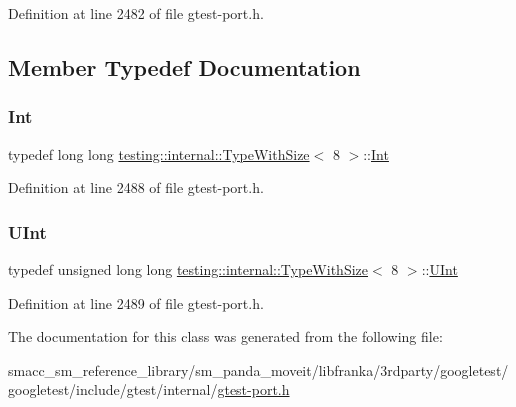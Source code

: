 Definition at line 2482 of file gtest-\/port.\+h.



\subsection{Member Typedef Documentation}
\mbox{\label{classtesting_1_1internal_1_1TypeWithSize_3_018_01_4_a36d5697e5f5254b0495f13c97d747e36}} 
\subsubsection{\texorpdfstring{Int}{Int}}
{\footnotesize\ttfamily typedef long long \hyperlink{classtesting_1_1internal_1_1TypeWithSize}{testing\+::internal\+::\+Type\+With\+Size}$<$ 8 $>$\+::\hyperlink{classtesting_1_1internal_1_1TypeWithSize_3_018_01_4_a36d5697e5f5254b0495f13c97d747e36}{Int}}



Definition at line 2488 of file gtest-\/port.\+h.

\mbox{\label{classtesting_1_1internal_1_1TypeWithSize_3_018_01_4_a747e21c5aee8faf07ec65cd4c3d1ca62}} 
\subsubsection{\texorpdfstring{U\+Int}{UInt}}
{\footnotesize\ttfamily typedef unsigned long long \hyperlink{classtesting_1_1internal_1_1TypeWithSize}{testing\+::internal\+::\+Type\+With\+Size}$<$ 8 $>$\+::\hyperlink{classtesting_1_1internal_1_1TypeWithSize_3_018_01_4_a747e21c5aee8faf07ec65cd4c3d1ca62}{U\+Int}}



Definition at line 2489 of file gtest-\/port.\+h.



The documentation for this class was generated from the following file\+:\begin{DoxyCompactItemize}
\item 
smacc\+\_\+sm\+\_\+reference\+\_\+library/sm\+\_\+panda\+\_\+moveit/libfranka/3rdparty/googletest/googletest/include/gtest/internal/\hyperlink{gtest-port_8h}{gtest-\/port.\+h}\end{DoxyCompactItemize}
